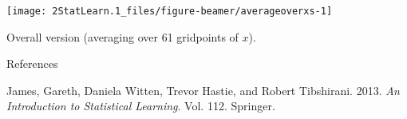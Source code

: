 \documentclass[ignorenonframetext,]{beamer}
\begin{document}
\begin{frame}

\begin{center}\texttt{[image: 2StatLearn.1\_files/figure-beamer/averageoverxs-1]} \end{center}

Overall version (averaging over 61 gridpoints of \(x\)).

\end{frame}

\begin{frame}{References}
\protect\hypertarget{references}{}

\hypertarget{refs}{}
\leavevmode\hypertarget{ref-ISL}{}%
James, Gareth, Daniela Witten, Trevor Hastie, and Robert Tibshirani.
2013. \emph{An Introduction to Statistical Learning}. Vol. 112.
Springer.

\end{frame}
\end{document}
